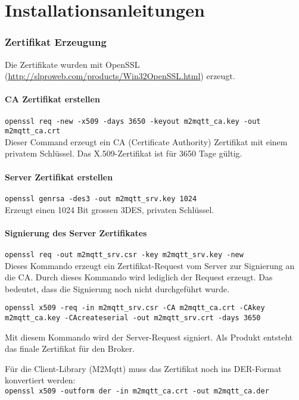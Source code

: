 \chapter{Installationsanleitungen}

\subsection*{Zertifikat Erzeugung}
Die Zertifikate wurden mit OpenSSL (\url{http://slproweb.com/products/Win32OpenSSL.html}) erzeugt.

\subsubsection*{CA Zertifikat erstellen}
\lstinline!openssl req -new -x509 -days 3650 -keyout m2mqtt_ca.key -out m2mqtt_ca.crt! \\
Dieser Command erzeugt ein CA (Certificate Authority) Zertifikat mit einem privatem Schlüssel. Das X.509-Zertifikat ist für 3650 Tage gültig.

\subsubsection*{Server Zertifikat erstellen}
\lstinline!openssl genrsa -des3 -out m2mqtt_srv.key 1024! \\
Erzeugt einen 1024 Bit grossen 3DES, privaten Schlüssel. 

\subsubsection*{Signierung des Server Zertifikates}
\lstinline!openssl req -out m2mqtt_srv.csr -key m2mqtt_srv.key -new! \\
Dieses Kommando erzeugt ein Zertifikat-Request vom Server zur Signierung an die CA. Durch dieses Kommando wird lediglich der Request erzeugt. Das bedeutet, dass die Signierung noch nicht durchgeführt wurde.

\lstinline!openssl x509 -req -in m2mqtt_srv.csr -CA m2mqtt_ca.crt -CAkey m2mqtt_ca.key -CAcreateserial -out m2mqtt_srv.crt -days 3650!

Mit diesem Kommando wird der Server-Request signiert. Als Produkt entsteht das finale Zertifikat für den Broker.

Für die Client-Library (M2Mqtt) muss das Zertifikat noch ins DER-Format konvertiert werden: \\
\lstinline!openssl x509 -outform der -in m2mqtt_ca.crt -out m2mqtt_ca.der!